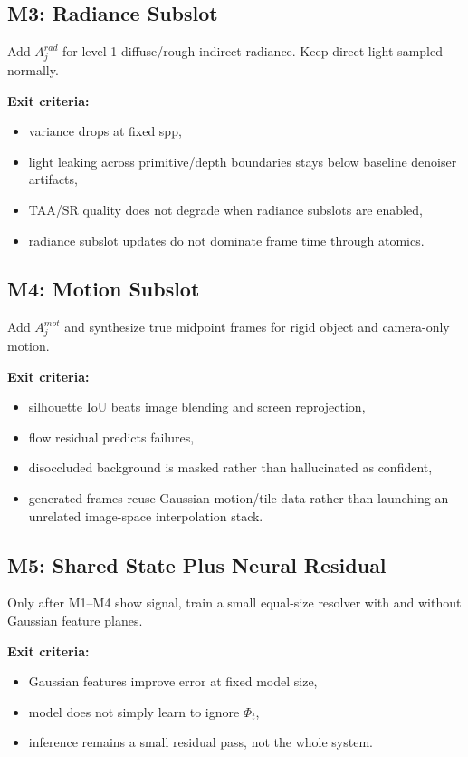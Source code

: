 \documentclass[11pt]{article}
\begin{document}
\subsection{M3: Radiance Subslot}

Add $A_j^{rad}$ for level-1 diffuse/rough indirect radiance. Keep direct light
sampled normally.

\textbf{Exit criteria:}

\begin{itemize}
  \item variance drops at fixed spp,
  \item light leaking across primitive/depth boundaries stays below baseline
        denoiser artifacts,
  \item TAA/SR quality does not degrade when radiance subslots are enabled,
  \item radiance subslot updates do not dominate frame time through atomics.
\end{itemize}

\subsection{M4: Motion Subslot}

Add $A_j^{mot}$ and synthesize true midpoint frames for rigid object and
camera-only motion.

\textbf{Exit criteria:}

\begin{itemize}
  \item silhouette IoU beats image blending and screen reprojection,
  \item flow residual predicts failures,
  \item disoccluded background is masked rather than hallucinated as confident,
  \item generated frames reuse Gaussian motion/tile data rather than launching
        an unrelated image-space interpolation stack.
\end{itemize}

\subsection{M5: Shared State Plus Neural Residual}

Only after M1--M4 show signal, train a small equal-size resolver with and
without Gaussian feature planes.

\textbf{Exit criteria:}

\begin{itemize}
  \item Gaussian features improve error at fixed model size,
  \item model does not simply learn to ignore $\Phi_t$,
  \item inference remains a small residual pass, not the whole system.
\end{itemize}
\end{document}
